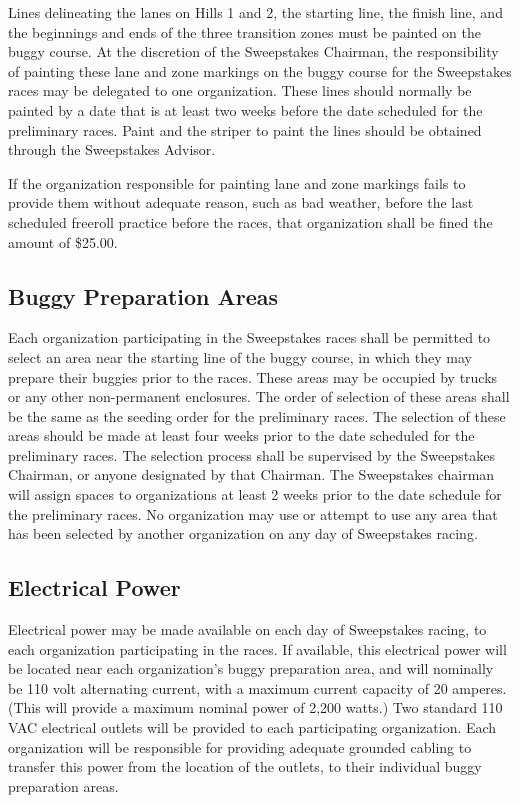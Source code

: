 \documentclass[openany]{book}
\begin{document}
Lines delineating the lanes on Hills 1 and 2, the starting line, the finish line, and the beginnings and ends of the three transition zones must be painted on the buggy course. At the discretion of the Sweepstakes Chairman, the responsibility of painting these lane and zone markings on the buggy course for the Sweepstakes races may be delegated to one organization. These lines should normally be painted by a date that is at least two weeks before the date scheduled for the preliminary races. Paint and the striper to paint the lines should be obtained through the Sweepstakes Advisor.

If the organization responsible for painting lane and zone markings fails to provide them without adequate reason, such as bad weather, before the last scheduled freeroll practice before the races, that organization shall be fined the amount of \$25.00.

\subsection{Buggy Preparation Areas}

Each organization participating in the Sweepstakes races shall be permitted to select an area near the starting line of the buggy course, in which they may prepare their buggies prior to the races. These areas may be occupied by trucks or any other non-permanent enclosures. The order of selection of these areas shall be the same as the seeding order for the preliminary races. The selection of these areas should be made at least four weeks prior to the date scheduled for the preliminary races. The selection process shall be supervised by the Sweepstakes Chairman, or anyone designated by that Chairman. The Sweepstakes chairman will assign spaces to organizations at least 2 weeks prior to the date schedule for the preliminary races. No organization may use or attempt to use any area that has been selected by another organization on any day of Sweepstakes racing.

\subsection{Electrical Power}

Electrical power may be made available on each day of Sweepstakes racing, to each organization participating in the races. If available, this electrical power will be located near each organization's buggy preparation area, and will nominally be 110 volt alternating current, with a maximum current capacity of 20 amperes. (This will provide a maximum nominal power of 2,200 watts.) Two standard 110 VAC electrical outlets will be provided to each participating organization. Each organization will be responsible for providing adequate grounded cabling to transfer this power from the location of the outlets, to their individual buggy preparation areas.
\end{document}
